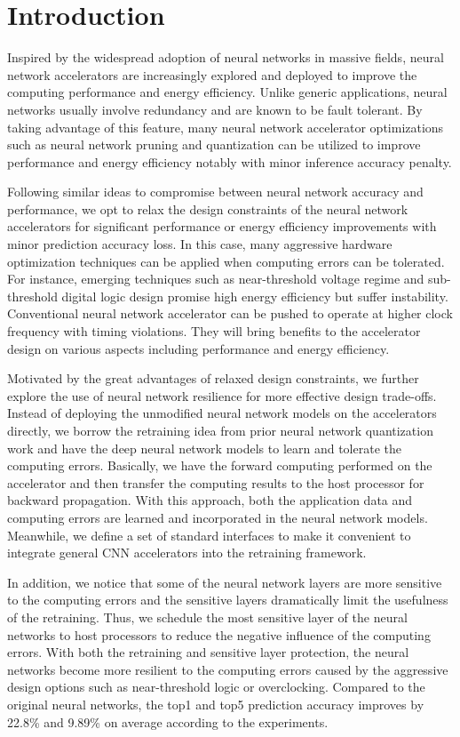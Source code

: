 \section{Introduction} \label{sec:intro}
Inspired by the widespread adoption of neural networks in massive fields, neural network accelerators 
\cite{deepburing_12,DiCecco_4} 
are increasingly explored and deployed to improve the computing performance and energy efficiency.
Unlike generic applications, neural networks usually involve redundancy and are known to be 
fault tolerant\cite{Reagen2016}. By taking advantage of this feature, many neural network accelerator optimizations 
such as neural network pruning and quantization can be utilized to improve 
performance and energy efficiency notably with minor inference accuracy penalty\cite{Han2016DeepCC}. 

Following similar ideas to compromise between neural network accuracy and performance, 
we opt to relax the design constraints of the neural network accelerators 
for significant performance or energy efficiency improvements with 
minor prediction accuracy loss. In this case, many aggressive hardware 
optimization techniques can be applied when computing errors can 
be tolerated. For instance, emerging techniques such as
near-threshold voltage regime and sub-threshold digital
logic design promise high energy efficiency but suffer
instability. Conventional neural network accelerator can
be pushed to operate at higher clock frequency with timing
violations. They will bring benefits to the accelerator design 
on various aspects including performance and energy efficiency.

Motivated by the great advantages of relaxed design constraints,
we further explore the use of neural network resilience
for more effective design trade-offs. Instead of deploying the 
unmodified neural network models on the accelerators directly, 
we borrow the retraining idea from prior neural network 
quantization work and have the deep neural network models to 
learn and tolerate the computing errors.
Basically, we have the forward computing
performed on the accelerator and then transfer the computing
results to the host processor for backward propagation. With
this approach, both the application data and computing errors
are learned and incorporated in the neural network models.
Meanwhile, we define a set of standard interfaces to make
it convenient to integrate general CNN accelerators into the
retraining framework.

In addition, we notice that some of the neural network layers
are more sensitive to the computing errors and the sensitive
layers dramatically limit the usefulness of the retraining. Thus,
we schedule the most sensitive layer of the neural networks
to host processors to reduce the negative influence of the
computing errors. With both the retraining and sensitive layer
protection, the neural networks become more resilient to the
computing errors caused by the aggressive design options
such as near-threshold logic or overclocking. Compared to the
original neural networks, the top1 and top5 prediction accuracy
improves by 22.8\% and 9.89\% on average according to the
experiments.

